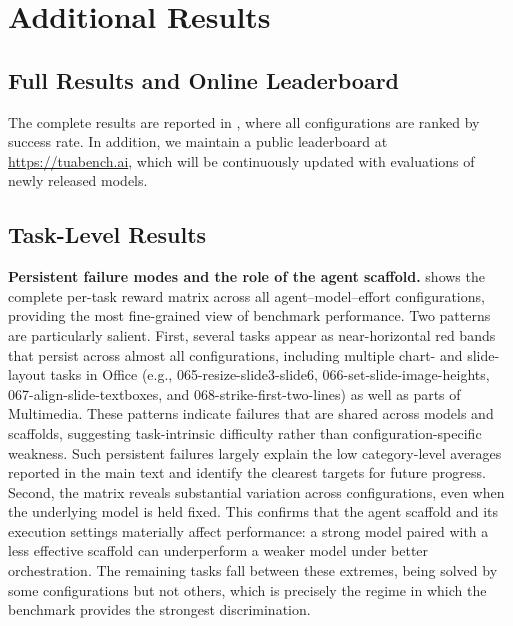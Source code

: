 \section{Additional Results}

\subsection{Full Results and Online Leaderboard}
The complete results are reported in , where all configurations are ranked by success rate. In addition, we maintain a public leaderboard at \url{https://tuabench.ai}, which will be continuously updated with evaluations of newly released models.


\subsection{Task-Level Results}
\noindent\textbf{Persistent failure modes and the role of the agent scaffold.}
 shows the complete per-task reward matrix across all agent--model--effort configurations, providing the most fine-grained view of benchmark performance. Two patterns are particularly salient. First, several tasks appear as near-horizontal red bands that persist across almost all configurations, including multiple chart- and slide-layout tasks in Office (e.g., 065-resize-slide3-slide6, 066-set-slide-image-heights, 067-align-slide-textboxes, and 068-strike-first-two-lines) as well as parts of Multimedia. These patterns indicate failures that are shared across models and scaffolds, suggesting task-intrinsic difficulty rather than configuration-specific weakness. Such persistent failures largely explain the low category-level averages reported in the main text and identify the clearest targets for future progress. Second, the matrix reveals substantial variation across configurations, even when the underlying model is held fixed. This confirms that the agent scaffold and its execution settings materially affect performance: a strong model paired with a less effective scaffold can underperform a weaker model under better orchestration. The remaining tasks fall between these extremes, being solved by some configurations but not others, which is precisely the regime in which the benchmark provides the strongest discrimination.

